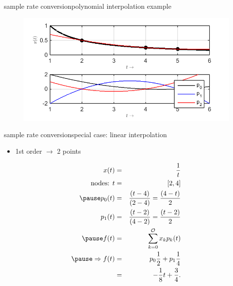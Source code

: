 	\begin{frame}{sample rate conversion}{polynomial interpolation example}
        \begin{figure}
            \begin{center}
                \includegraphics[scale=0.8]{graph/PolynomInterpol}
            \end{center}
        \end{figure}
    \end{frame}
	\begin{frame}{sample rate conversion}{special case: linear interpolation}
        \begin{itemize}
            \item   1st order $\rightarrow$ 2 points
        \end{itemize}
        \begin{footnotesize}
        \begin{eqnarray*}
            x(t) &=& \frac{1}{t}\\
            \text{nodes: } t &=& [2, 4]\\
            \pause
            p_0(t) &=& \frac{(t-4)}{(2-4)} = \frac{(4-t)}{2}\\
            p_1(t) &=& \frac{(t-2)}{(4-2)} = \frac{(t-2)}{2}\\
            \pause
             f(t) &=& \sum\limits_{k=0}^\mathcal{O}x_k p_k(t)\\
            \pause
            \Rightarrow f(t) &=& p_0\frac{1}{2}+p_1\frac{1}{4}\\
            &=& - \frac{1}{8}t + \frac{3}{4}.
        \end{eqnarray*}
         \end{footnotesize}
    \end{frame}
